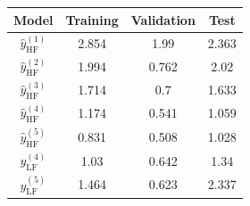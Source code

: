 \begin{tabular}{cccc}
\toprule
Model & Training & Validation & Test \\
\midrule
$\hat{y}_\text{HF}^{(1)}$ & 2.854 & 1.99 & 2.363 \\
$\hat{y}_\text{HF}^{(2)}$ & 1.994 & 0.762 & 2.02 \\
$\hat{y}_\text{HF}^{(3)}$ & 1.714 & 0.7 & 1.633 \\
$\hat{y}_\text{HF}^{(4)}$ & 1.174 & 0.541 & 1.059 \\
$\hat{y}_\text{HF}^{(5)}$ & 0.831 & 0.508 & 1.028 \\
${y}_\mathrm{LF}^{(4)}$ & 1.03 & 0.642 & 1.34 \\
${y}_\mathrm{LF}^{(5)}$ & 1.464 & 0.623 & 2.337 \\
\bottomrule
\end{tabular}
